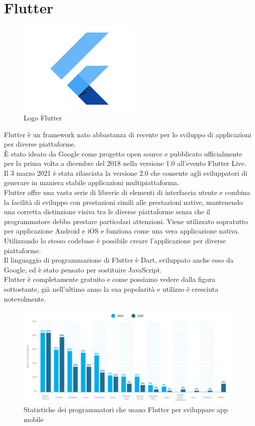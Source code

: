 \section{Flutter}
\begin{figure}[htbp]	
	\centering
	\includegraphics[width=6cm]{immagini/flutterlogo.jpg}
	\caption{Logo Flutter}
	\label{fig:Logo Flutter}
\end{figure}
Flutter è un framework nato abbastanza di recente per lo sviluppo di applicazioni per diverse piattaforme.\\
È stato ideato da Google come progetto open source e pubblicato ufficialmente per la prima volta a dicembre del 2018 nella versione 1.0 all'evento Flutter Live.\\
Il 3 marzo 2021 è stata rilasciata la versione 2.0 che consente agli sviluppatori di generare in maniera stabile applicazioni multipiattaforma.\\
Flutter offre una vasta serie di librerie di elementi di interfaccia utente e combina la facilità di sviluppo con prestazioni simili alle prestazioni native, mantenendo una corretta distinzione visiva tra le diverse piattaforme senza che il programmatore debba prestare particolari attenzioni.
Viene utilizzato sopratutto per applicazione Android e iOS e funziona come una vera applicazione nativa.\\
Utilizzando lo stesso codebase è possibile creare l'applicazione per diverse piattaforme.\\
Il linguaggio di programmazione di Flutter è Dart, sviluppato anche esso da Google, ed è stato pensato per sostituire JavaScript.\\
Flutter è completamente gratuito e come possiamo vedere dalla figura sottostante, già nell'ultimo anno la sua popolarità e utilizzo è cresciuta notevolmente.\\
\begin{figure}[htbp]	
	\centering
	\includegraphics[width=13cm]{immagini/statisticheflutter.png}
	\caption{Statistiche dei programmatori che usano Flutter per sviluppare app mobile}
	\label{fig:Statistiche dei programmatori che usano Flutter per sviluppare app mobile}
\end{figure}
